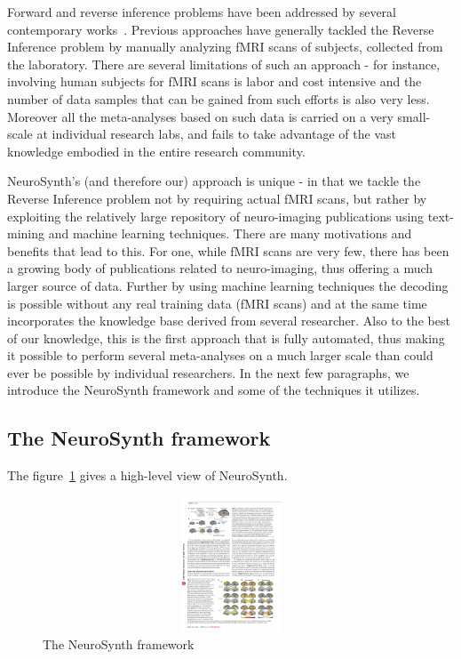 \documentclass{article} %
\begin{document}
Forward and reverse inference problems have been addressed by several contemporary works~\cite{schwartz2013mapping, PMSKBY12, sanmi2013multi, yarkoni2011large}. Previous approaches have generally tackled the Reverse Inference problem by manually analyzing fMRI scans of subjects, collected from the laboratory. There are several limitations of such an approach - for instance, involving human subjects for fMRI scans is labor and cost intensive and the number of data samples that can be gained from such efforts is also very less. Moreover all the meta-analyses based on such data is carried on a very small-scale at individual research labs, and fails to take advantage of the vast knowledge embodied in the entire research community. 

NeuroSynth's (and therefore our) approach is unique - in that we tackle the Reverse Inference problem not by requiring actual fMRI scans, but rather by exploiting the relatively large repository of neuro-imaging publications using text-mining and machine learning techniques.  There are many motivations and benefits that lead to this. For one, while fMRI scans are very few, there has been a growing body of publications related to neuro-imaging, thus offering a much larger source of data. Further by using machine learning techniques the decoding is possible without any real training data (fMRI scans) and at the same time incorporates the knowledge base derived from several researcher. Also to the best of our knowledge, this is the first approach that is fully automated, thus making it possible to perform several meta-analyses on a much larger scale than could ever be possible by individual researchers.  In the next few paragraphs, we introduce the NeuroSynth framework and some of the techniques it utilizes.

\subsection{The NeuroSynth framework}
The figure~\ref{fig:3steps} gives a high-level view of  NeuroSynth. 

\begin{figure}[h]
\begin{center}
\includegraphics[height=4cm, width=14cm]{3steps.pdf}
\end{center}
\caption{The NeuroSynth framework~\cite{yarkoni2011large}}
\label{fig:3steps}
\end{figure}
\end{document}
